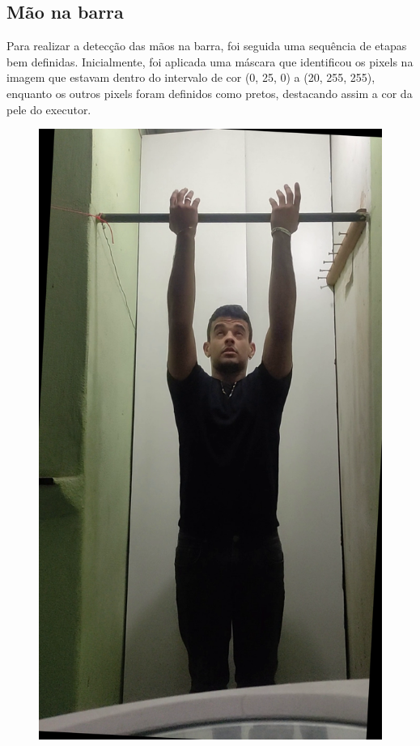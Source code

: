 \subsection[Mão na barra]{Mão na barra}\label{sec:Mao na barra}


Para realizar a detecção das mãos na barra, foi seguida uma sequência de etapas bem definidas. Inicialmente, foi aplicada uma máscara que identificou os pixels na imagem que estavam dentro do intervalo de cor (0, 25, 0) a (20, 255, 255), enquanto os outros pixels foram definidos como pretos, destacando assim a cor da pele do executor.

\renewcommand{\sizeImg}{0.4}
\begin{figure}[!htbp]
    \centering
        \begin{minipage}{\sizeImg\textwidth}
            \includegraphics[width=\textwidth]{figuras/mao_barra/original.png}

\end{minipage}
\end{figure}
